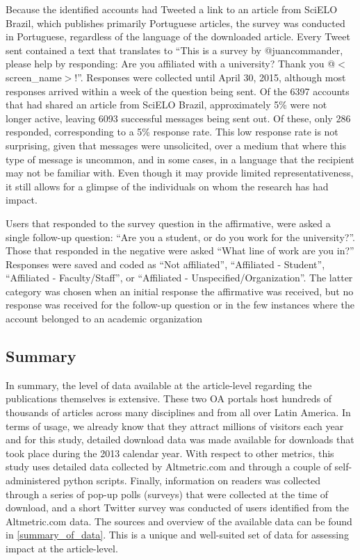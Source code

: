 Because the identified accounts had Tweeted a link to an article from SciELO Brazil, which publishes primarily Portuguese articles, the survey was conducted in Portuguese, regardless of the language of the downloaded article. Every Tweet sent contained a text that translates to ``This is a survey by @juancommander, please help by responding: Are you affiliated with a university? Thank you @$<$screen\_name$>$!''. Responses were collected until April 30, 2015, although most responses arrived within a week of the question being sent. Of the 6397 accounts that had shared an article from SciELO Brazil, approximately 5\% were not longer active, leaving 6093 successful messages being sent out. Of these, only 286 responded, corresponding to a 5\% response rate. This low response rate is not surprising, given that messages were unsolicited, over a medium that where this type of message is uncommon, and in some cases, in a language that the recipient may not be familiar with. Even though it may provide limited representativeness, it still allows for a glimpse of the individuals on whom the research has had impact.

Users that responded to the survey question in the affirmative, were asked a single follow-up question: ``Are you a student, or do you work for the university?''. Those that responded in the negative were asked ``What line of work are you in?'' Responses were saved and coded as ``Not affiliated'', ``Affiliated - Student'', ``Affiliated - Faculty\slash Staff'', or ``Affiliated - Unspecified\slash Organization''. The latter category was chosen when an initial response the affirmative was received, but no response was received for the follow-up question or in the few instances where the account belonged to an academic organization

\subsection{Summary}
\label{summary}

In summary, the level of data available at the article-level regarding the publications themselves is extensive. These two OA portals host hundreds of thousands of articles across many disciplines and from all over Latin America. In terms of usage, we already know that they attract millions of visitors each year and for this study, detailed download data was made available for downloads that took place during the 2013 calendar year. With respect to other metrics, this study uses detailed data collected by Altmetric.com and through a couple of self-administered python scripts. Finally, information on readers was collected through a series of pop-up polls (surveys) that were collected at the time of download, and a short Twitter survey was conducted of users identified from the Altmetric.com data. The sources and overview of the available data can be found in \autoref{summary_of_data}. This is a unique and well-suited set of data for assessing impact at the article-level.

